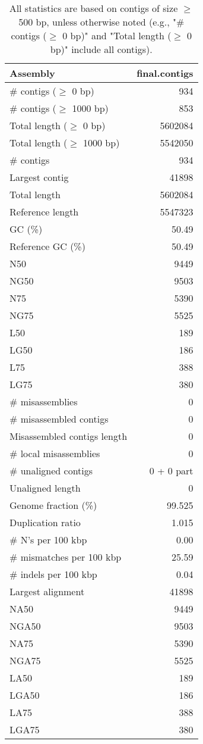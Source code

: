 \documentclass[12pt,a4paper]{article}
\begin{document}
\begin{table}[ht]
\begin{center}
\caption{All statistics are based on contigs of size $\geq$ 500 bp, unless otherwise noted (e.g., "\# contigs ($\geq$ 0 bp)" and "Total length ($\geq$ 0 bp)" include all contigs).}
\begin{tabular}{|l*{1}{|r}|}
\hline
Assembly & final.contigs \\ \hline
\# contigs ($\geq$ 0 bp) & 934 \\ \hline
\# contigs ($\geq$ 1000 bp) & 853 \\ \hline
Total length ($\geq$ 0 bp) & 5602084 \\ \hline
Total length ($\geq$ 1000 bp) & 5542050 \\ \hline
\# contigs & 934 \\ \hline
Largest contig & 41898 \\ \hline
Total length & 5602084 \\ \hline
Reference length & 5547323 \\ \hline
GC (\%) & 50.49 \\ \hline
Reference GC (\%) & 50.49 \\ \hline
N50 & 9449 \\ \hline
NG50 & 9503 \\ \hline
N75 & 5390 \\ \hline
NG75 & 5525 \\ \hline
L50 & 189 \\ \hline
LG50 & 186 \\ \hline
L75 & 388 \\ \hline
LG75 & 380 \\ \hline
\# misassemblies & 0 \\ \hline
\# misassembled contigs & 0 \\ \hline
Misassembled contigs length & 0 \\ \hline
\# local misassemblies & 0 \\ \hline
\# unaligned contigs & 0 + 0 part \\ \hline
Unaligned length & 0 \\ \hline
Genome fraction (\%) & 99.525 \\ \hline
Duplication ratio & 1.015 \\ \hline
\# N's per 100 kbp & 0.00 \\ \hline
\# mismatches per 100 kbp & 25.59 \\ \hline
\# indels per 100 kbp & 0.04 \\ \hline
Largest alignment & 41898 \\ \hline
NA50 & 9449 \\ \hline
NGA50 & 9503 \\ \hline
NA75 & 5390 \\ \hline
NGA75 & 5525 \\ \hline
LA50 & 189 \\ \hline
LGA50 & 186 \\ \hline
LA75 & 388 \\ \hline
LGA75 & 380 \\ \hline
\end{tabular}
\end{center}
\end{table}
\end{document}
